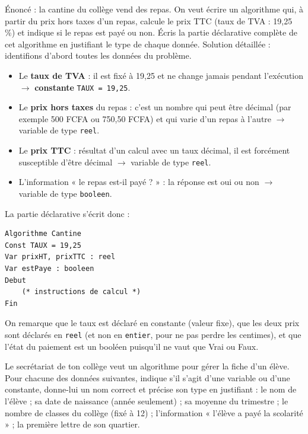 \documentclass[11pt]{article}
\begin{document}
\begin{exoresolu}
Énoncé : la cantine du collège vend des repas. On veut écrire un algorithme qui, à partir du prix hors taxes d'un repas, calcule le prix TTC (taux de TVA : 19,25 \%) et indique si le repas est payé ou non. Écris la partie déclarative complète de cet algorithme en justifiant le type de chaque donnée.
\tcblower
Solution détaillée : identifions d'abord toutes les données du problème.
\begin{itemize}
\item Le \textbf{taux de TVA} : il est fixé à 19,25 et ne change jamais pendant l'exécution $\rightarrow$ \textbf{constante} \texttt{TAUX = 19,25}.
\item Le \textbf{prix hors taxes} du repas : c'est un nombre qui peut être décimal (par exemple 500 FCFA ou 750,50 FCFA) et qui varie d'un repas à l'autre $\rightarrow$ variable de type \texttt{reel}.
\item Le \textbf{prix TTC} : résultat d'un calcul avec un taux décimal, il est forcément susceptible d'être décimal $\rightarrow$ variable de type \texttt{reel}.
\item L'information « le repas est-il payé ? » : la réponse est oui ou non $\rightarrow$ variable de type \texttt{booleen}.
\end{itemize}
La partie déclarative s'écrit donc :
\begin{lstlisting}
Algorithme Cantine
Const TAUX = 19,25
Var prixHT, prixTTC : reel
Var estPaye : booleen
Debut
    (* instructions de calcul *)
Fin
\end{lstlisting}
On remarque que le taux est déclaré en constante (valeur fixe), que les deux prix sont déclarés en \texttt{reel} (et non en \texttt{entier}, pour ne pas perdre les centimes), et que l'état du paiement est un booléen puisqu'il ne vaut que Vrai ou Faux.
\end{exoresolu}

\begin{exercice}
Le secrétariat de ton collège veut un algorithme pour gérer la fiche d'un élève. Pour chacune des données suivantes, indique s'il s'agit d'une variable ou d'une constante, donne-lui un nom correct et précise son type en justifiant : le nom de l'élève ; sa date de naissance (année seulement) ; sa moyenne du trimestre ; le nombre de classes du collège (fixé à 12) ; l'information « l'élève a payé la scolarité » ; la première lettre de son quartier.
\end{exercice}
\end{document}
